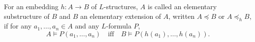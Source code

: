 For an embedding $h : A \rightarrow B$ of $L$-structures, $A$ is called an elementary substructure of $B$ and $B$ an elementary extension of $A$, written $A \preceq B$ or $A \preceq_h B$, if for any $a_1, \ldots, a_n \in A$ and any $L$-formula $P$,
$$A \vDash P(a_1, \ldots, a_n) \quad \text{iff} \quad B \vDash P(h(a_1), \ldots, h(a_n)).$$
